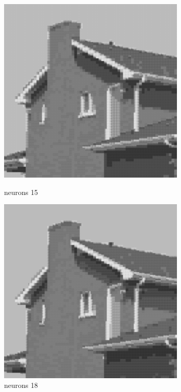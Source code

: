 \documentclass[../IDP_Task5_Karwowski_Kowalewski.tex]{subfiles}
\begin{document}
{{        \begin{figure}[!htbp]
            \begin{minipage}[c]{0.45\linewidth}
                \centering
                \includegraphics[width=0.8\textwidth]{img/kowalewski/crop_size_4_neurons_15.png}
                \caption{neurons 15}
            \end{minipage}\hfill
            \begin{minipage}[c]{0.45\linewidth}
                \centering
                \includegraphics[width=0.8\textwidth]{img/kowalewski/crop_size_4_neurons_18.png}
                \caption{neurons 18}
            \end{minipage}
        \end{figure}

}}
\end{document}
